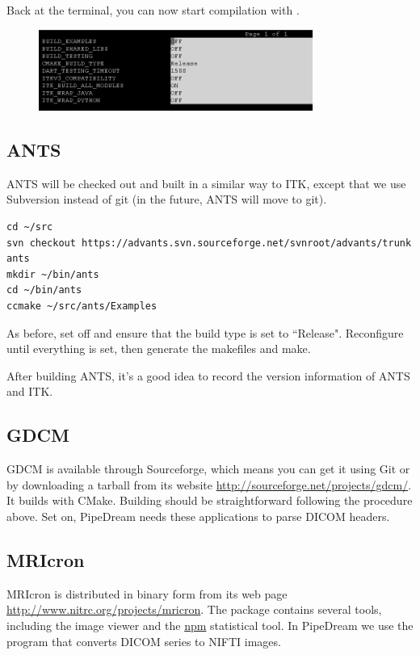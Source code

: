 \documentclass{InsightArticle}
\begin{document}
Back at the terminal, you can now start compilation with .

\begin{figure}
\includegraphics[width=0.8\textwidth]{figures/itk_ccmake.png} 
\label{fig:itkCCMake}
\end{figure}


\subsection{ANTS}

ANTS will be checked out and built in a similar way to ITK, except that we use Subversion instead of git (in the future, ANTS will move to git).
\begin{lstlisting}[style=bash]
cd ~/src
svn checkout https://advants.svn.sourceforge.net/svnroot/advants/trunk ants
mkdir ~/bin/ants
cd ~/bin/ants
ccmake ~/src/ants/Examples
\end{lstlisting}
As before, set  off and ensure that the build type is set to ``Release". Reconfigure until everything is set, then generate the makefiles and make.

After building ANTS, it's a good idea to record the version information of ANTS and ITK. 

\subsection{GDCM}

GDCM is available through Sourceforge, which means you can get it using Git or by downloading a tarball from its website \url{http://sourceforge.net/projects/gdcm/}. It builds with CMake. Building should be straightforward following the procedure above. Set  on, PipeDream needs these applications to parse DICOM headers.

\subsection{MRIcron}

MRIcron is distributed in binary form from its web page \url{http://www.nitrc.org/projects/mricron}. The package contains several tools, including the  image viewer and the \url{npm} statistical tool. In PipeDream we use the  program that converts DICOM series to NIFTI images.
\end{document}
